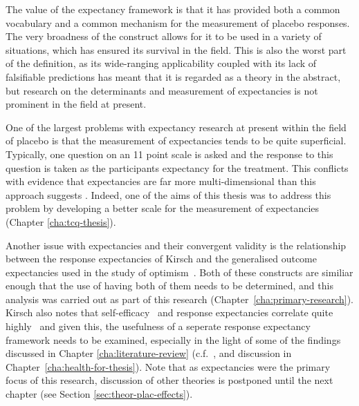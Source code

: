 
The value of the expectancy framework is that it has provided both a common vocabulary and a common mechanism for the measurement of placebo responses. The very broadness of the construct allows for it to be used in a variety of situations, which has ensured its survival in the field. This is also the worst part of the definition, as its wide-ranging applicability coupled with its lack of falsifiable predictions has meant that it is regarded as a theory in the abstract, but research on the determinants and measurement of expectancies is not prominent in the field at present.

One of the largest problems with expectancy research at present within the field of placebo is that the measurement of expectancies tends to be quite superficial. Typically, one question on an 11 point scale is asked and the response to this question is taken as the participants expectancy for the treatment. This conflicts with evidence that expectancies are far more multi-dimensional than this approach suggests \cite{Stone2005}. Indeed, one of the aims of this thesis was to address this problem by developing a better scale for the measurement of expectancies (Chapter \ref{cha:tcq-thesis}). 

Another issue with expectancies and their convergent validity is the relationship between the response expectancies of Kirsch  and the generalised outcome expectancies used in the study of optimism~\cite{Carver2010}. Both of these constructs are similiar enough that the use of having both of them needs to be determined, and this analysis was carried out as part of this research (Chapter~\ref{cha:primary-research}). Kirsch also notes that self-efficacy~\cite{Bandura1977} and response expectancies correlate quite highly~\cite{Kirsch1985} and given this, the usefulness of a seperate response expectancy framework needs to be examined, especially in the light of some of the findings discussed in Chapter \ref{cha:literature-review} (c.f.~\cite{Geers2005,Hyland2007}, and discussion in Chapter~\ref{cha:health-for-thesis}). Note that as expectancies were the primary focus of this research, discussion of other theories is postponed until the next chapter (see Section \ref{sec:theor-plac-effects}). 


